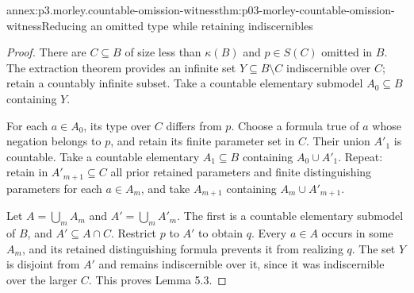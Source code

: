 \begin{annexitem}{annex:p3.morley.countable-omission-witness}{thm:p03-morley-countable-omission-witness}{Reducing an omitted type while retaining indiscernibles}
\begin{proof}
There are \(C\subseteq B\)
of size less than
\(\kappa(B)\) and
\(p\in S(C)\) omitted
in \(B\). The extraction
theorem provides an
infinite set \(Y\subseteq
B\setminus C\) indiscernible
over \(C\); retain a
countably infinite subset.
Take a countable elementary
submodel \(A_0\subseteq B\)
containing \(Y\).

For each \(a\in A_0\),
its type over \(C\)
differs from \(p\).
Choose a formula true
of \(a\) whose negation
belongs to \(p\), and
retain its finite
parameter set in \(C\).
Their union \(A'_1\)
is countable. Take a
countable elementary
\(A_1\subseteq B\)
containing \(A_0\cup A'_1\).
Repeat: retain in
\(A'_{m+1}\subseteq C\)
all prior retained
parameters and finite
distinguishing parameters
for each \(a\in A_m\),
and take \(A_{m+1}\)
containing \(A_m\cup
A'_{m+1}\).

Let \(A=\bigcup_mA_m\)
and \(A'=\bigcup_mA'_m\).
The first is a countable
elementary submodel of
\(B\), and \(A'\subseteq
A\cap C\). Restrict
\(p\) to \(A'\) to
obtain \(q\). Every
\(a\in A\) occurs in
some \(A_m\), and its
retained distinguishing
formula prevents it
from realizing \(q\).
The set \(Y\) is
disjoint from \(A'\)
and remains indiscernible
over it, since it was
indiscernible over
the larger \(C\).
This proves Lemma 5.3.
\end{proof}
\end{annexitem}

